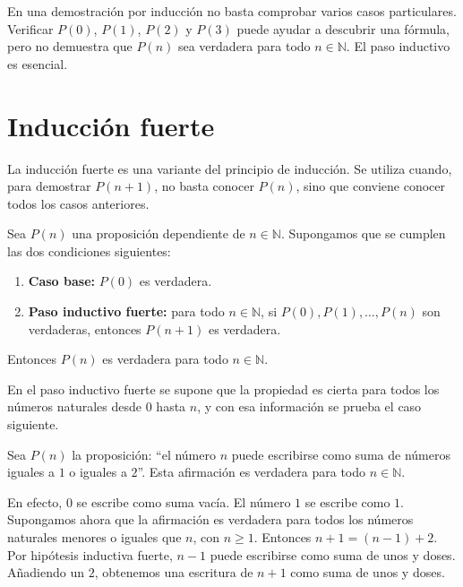 \begin{advertencia}
En una demostración por inducción no basta comprobar varios casos particulares. Verificar \(P(0)\), \(P(1)\), \(P(2)\) y \(P(3)\) puede ayudar a descubrir una fórmula, pero no demuestra que \(P(n)\) sea verdadera para todo \(n\in\mathbb{N}\). El paso inductivo es esencial.
\end{advertencia}

\section{Inducción fuerte}

La inducción fuerte es una variante del principio de inducción. Se utiliza cuando, para demostrar \(P(n+1)\), no basta conocer \(P(n)\), sino que conviene conocer todos los casos anteriores.

\begin{teorema}
Sea \(P(n)\) una proposición dependiente de \(n\in\mathbb{N}\). Supongamos que se cumplen las dos condiciones siguientes:
\begin{enumerate}
  \item \textbf{Caso base:} \(P(0)\) es verdadera.
  \item \textbf{Paso inductivo fuerte:} para todo \(n\in\mathbb{N}\), si \(P(0),P(1),\ldots,P(n)\) son verdaderas, entonces \(P(n+1)\) es verdadera.
\end{enumerate}
Entonces \(P(n)\) es verdadera para todo \(n\in\mathbb{N}\).
\end{teorema}

En el paso inductivo fuerte se supone que la propiedad es cierta para todos los números naturales desde \(0\) hasta \(n\), y con esa información se prueba el caso siguiente.

\begin{ejemplo}
Sea \(P(n)\) la proposición: ``el número \(n\) puede escribirse como suma de números iguales a \(1\) o iguales a \(2\)''. Esta afirmación es verdadera para todo \(n\in\mathbb{N}\).

En efecto, \(0\) se escribe como suma vacía. El número \(1\) se escribe como \(1\). Supongamos ahora que la afirmación es verdadera para todos los números naturales menores o iguales que \(n\), con \(n\geq 1\). Entonces \(n+1=(n-1)+2\). Por hipótesis inductiva fuerte, \(n-1\) puede escribirse como suma de unos y doses. Añadiendo un \(2\), obtenemos una escritura de \(n+1\) como suma de unos y doses.
\end{ejemplo}

